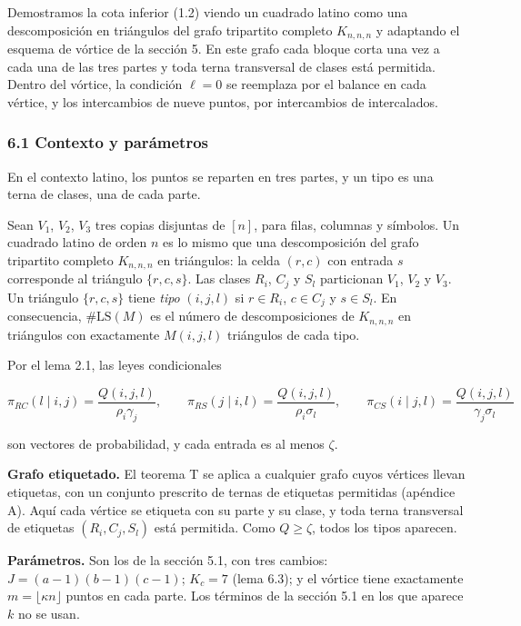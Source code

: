 \documentclass[spanish,11pt,a4paper]{article}
\begin{document}
Demostramos la cota inferior (1.2) viendo un cuadrado latino como una descomposición en triángulos del grafo tripartito completo \(K_{n,n,n}\) y adaptando el esquema de vórtice de la sección 5. En este grafo cada bloque corta una vez a cada una de las tres partes y toda terna transversal de clases está permitida. Dentro del vórtice, la condición \(\ell=0\) se reemplaza por el balance en cada vértice, y los intercambios de nueve puntos, por intercambios de intercalados.

\subsubsection{6.1 Contexto y parámetros}\label{contexto-y-paruxe1metros}

En el contexto latino, los puntos se reparten en tres partes, y un tipo es una terna de clases, una de cada parte.

Sean \(V_1\), \(V_2\), \(V_3\) tres copias disjuntas de \([n]\), para filas, columnas y símbolos. Un cuadrado latino de orden \(n\) es lo mismo que una descomposición del grafo tripartito completo \(K_{n,n,n}\) en triángulos: la celda \((r,c)\) con entrada \(s\) corresponde al triángulo \(\{r,c,s\}\). Las clases \(R_i\), \(C_j\) y \(S_l\) particionan \(V_1\), \(V_2\) y \(V_3\). Un triángulo \(\{r,c,s\}\) tiene \emph{tipo} \((i,j,l)\) si \(r\in R_i\), \(c\in C_j\) y \(s\in S_l\). En consecuencia, \(\#\mathrm{LS}(M)\) es el número de descomposiciones de \(K_{n,n,n}\) en triángulos con exactamente \(M(i,j,l)\) triángulos de cada tipo.

Por el lema 2.1, las leyes condicionales

\nopagebreak[4]
\[\pi_{RC}(l\mid i,j)=\frac{Q(i,j,l)}{\rho_i\gamma_j},\qquad
\pi_{RS}(j\mid i,l)=\frac{Q(i,j,l)}{\rho_i\sigma_l},\qquad
\pi_{CS}(i\mid j,l)=\frac{Q(i,j,l)}{\gamma_j\sigma_l}\]

son vectores de probabilidad, y cada entrada es al menos \(\zeta\).

\textbf{Grafo etiquetado.} El teorema T se aplica a cualquier grafo cuyos vértices llevan etiquetas, con un conjunto prescrito de ternas de etiquetas permitidas (apéndice A). Aquí cada vértice se etiqueta con su parte y su clase, y toda terna transversal de etiquetas \((R_i,C_j,S_l)\) está permitida. Como \(Q\ge\zeta\), todos los tipos aparecen.

\textbf{Parámetros.} Son los de la sección 5.1, con tres cambios: \(J=(a-1)(b-1)(c-1)\); \(K_c=7\) (lema 6.3); y el vórtice tiene exactamente \(m=\lfloor\kappa n\rfloor\) puntos en cada parte. Los términos de la sección 5.1 en los que aparece \(k\) no se usan.
\end{document}
